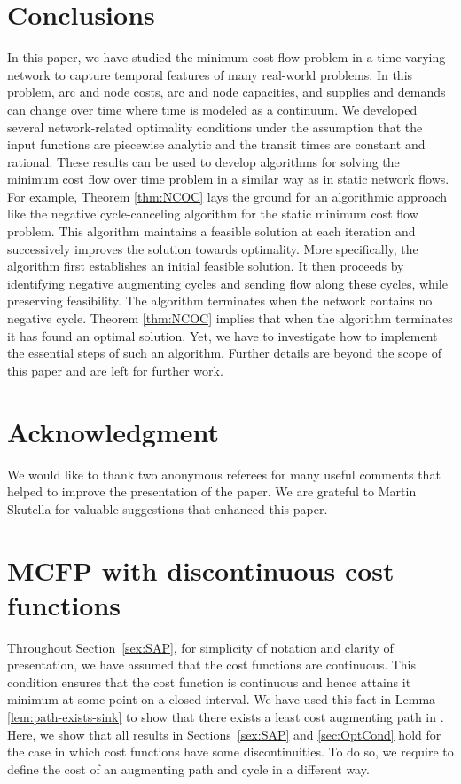 \documentclass{svjour3}                     \smartqed
\begin{document}
\section{Conclusions}
\label{sec:con}
In this paper, we have studied the minimum cost flow problem in a time-varying network to capture temporal features of many real-world problems. In this problem, arc and node costs, arc and node capacities, and supplies and demands can change over time where time is modeled as a continuum. We developed several network-related optimality conditions under the assumption that the input functions are piecewise analytic and the transit times are constant and rational. These results can be used to develop algorithms for solving the minimum cost flow over time problem in a similar way as in static network flows.  For example, Theorem \ref{thm:NCOC} lays the ground for an algorithmic approach like the negative cycle-canceling algorithm for the static minimum cost flow problem. This algorithm maintains a feasible solution at each iteration and successively improves the solution towards optimality. More specifically, the algorithm first establishes an initial feasible solution. It then proceeds by identifying negative augmenting cycles and sending flow along these cycles, while preserving feasibility. The algorithm terminates when the network contains no negative cycle. Theorem \ref{thm:NCOC} implies that when the algorithm terminates it has found an optimal solution. Yet, we have to investigate how to implement the essential steps of such an algorithm. Further details are beyond the scope of this paper and are left for further work.

\section*{Acknowledgment}
We would like to thank two anonymous referees for many useful comments that helped to improve the presentation of the paper. We are grateful to Martin Skutella for valuable suggestions that enhanced this paper. 




\appendix
\section{MCFP with discontinuous cost functions}
\label{sec:appendix}

Throughout Section~\ref{sex:SAP}, for simplicity of notation and clarity of presentation, we have assumed that the cost functions are continuous. This condition ensures that the cost function  is continuous and hence attains it minimum at some point on a closed interval. We have used this fact in Lemma \ref{lem:path-exists-sink} to show that there exists a least cost augmenting path in . Here, we show that all results in Sections~\ref{sex:SAP} and \ref{sec:OptCond} hold for the case in which cost functions have some discontinuities. To do so, we require to define the cost of an augmenting path and cycle in a different way.
\end{document}
